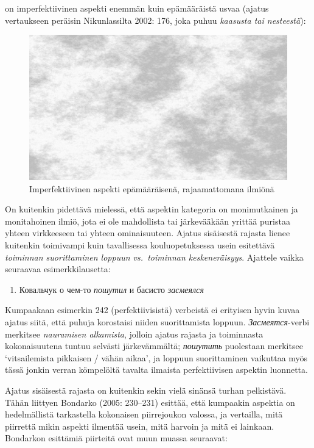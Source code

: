 \documentclass[]{scrreprt}
\providecommand{\tightlist}{%
  \setlength{\itemsep}{0pt}\setlength{\parskip}{0pt}}
\begin{document}
on imperfektiivinen aspekti enemmän kuin epämääräistä usvaa (ajatus
vertaukseen peräisin Nikunlassilta 2002: 176, joka puhuu \emph{kaasusta
tai nesteestä}):

\FloatBarrier
\begin{figure}[htbp]
\centering
\includegraphics[width=.6\textwidth]{../figure/silver-gray-mist-background.jpg}
\caption{Imperfektiivinen aspekti epämääräisenä, rajaamattomana ilmiönä}
\end{figure}
\FloatBarrier

On kuitenkin pidettävä mielessä, että aspektin kategoria on
monimutkainen ja monitahoinen ilmiö, jota ei ole mahdollista tai
järkevääkään yrittää puristaa yhteen virkkeeseen tai yhteen
ominaisuuteen. Ajatus sisäisestä rajasta lienee kuitenkin toimivampi
kuin tavallisessa kouluopetuksessa usein esitettävä \emph{toiminnan
suorittaminen loppuun vs.~toiminnan keskeneräisyys}. Ajattele vaikka
seuraavaa esimerkkilausetta:

\begin{enumerate}
\def\labelenumi{(\arabic{enumi})}
\setcounter{enumi}{241}
\tightlist
\item
  Ковальчук о чем-то \emph{пошутил} и басисто \emph{засмеялся}
\end{enumerate}

Kumpaakaan esimerkin 242 (perfektiivisistä) verbeistä ei erityisen hyvin
kuvaa ajatus siitä, että puhuja korostaisi niiden suorittamista loppuun.
\emph{Засмеятся}-verbi merkitsee \emph{nauramisen alkamista}, jolloin
ajatus rajasta ja toiminnasta kokonaisuutena tuntuu selvästi
järkevämmältä; \emph{пошутить} puolestaan merkitsee `vitsailemista
pikkaisen / vähän aikaa', ja loppuun suorittaminen vaikuttaa myös tässä
jonkin verran kömpelöltä tavalta ilmaista perfektiivisen aspektin
luonnetta.

Ajatus sisäisestä rajasta on kuitenkin sekin vielä sinänsä turhan
pelkistävä. Tähän liittyen Bondarko (2005: 230--231) esittää, että
kumpaakin aspektia on hedelmällistä tarkastella kokonaisen piirrejoukon
valossa, ja vertailla, mitä piirrettä mikin aspekti ilmentää usein, mitä
harvoin ja mitä ei lainkaan. Bondarkon esittämiä piirteitä ovat muun
muassa seuraavat:
\end{document}
